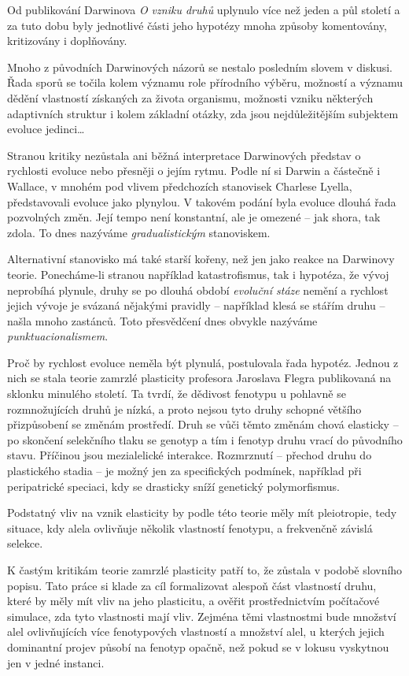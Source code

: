 Od publikování Darwinova \textit{O vzniku druhů} uplynulo více než jeden a půl století a za tuto dobu byly jednotlivé části
jeho hypotézy mnoha způsoby komentovány, kritizovány i doplňovány.

Mnoho z původních Darwinových názorů se nestalo posledním slovem v diskusi. Řada sporů se točila kolem významu role
přírodního výběru, možností a významu dědění vlastností získaných za života organismu, možnosti vzniku některých
adaptivních struktur i kolem základní otázky, zda jsou nejdůležitějším subjektem evoluce jedinci\ldots

%

Stranou kritiky nezůstala ani běžná interpretace Darwinových představ o rychlosti evoluce nebo přesněji o jejím rytmu.
Podle ní si Darwin a částečně i Wallace, v mnohém pod vlivem předchozích stanovisek Charlese Lyella,
představovali evoluce jako plynylou. V takovém podání byla evoluce dlouhá řada pozvolných změn. Její tempo není
konstantní, ale je omezené -- jak shora, tak zdola. To dnes nazýváme \textit{gradualistickým} stanoviskem.

Alternativní stanovisko má také starší kořeny, než jen jako reakce na Darwinovy teorie. Ponecháme-li stranou například
katastrofismus, tak i hypotéza, že vývoj neprobíhá plynule, druhy se po dlouhá období \textit{evoluční stáze} nemění
a rychlost jejich vývoje je svázaná nějakými pravidly -- například klesá se stářím druhu -- našla mnoho zastánců.
Toto přesvědčení dnes obvykle nazýváme \textit{punktuacionalismem}.

Proč by rychlost evoluce neměla být plynulá, postulovala řada hypotéz. Jednou z nich se stala teorie zamrzlé plasticity
profesora Jaroslava Flegra publikovaná na sklonku minulého století. Ta tvrdí, že dědivost fenotypu u pohlavně se
rozmnožujících druhů je nízká, a proto nejsou tyto druhy schopné většího přizpůsobení se změnám prostředí. Druh se vůči
těmto změnám chová elasticky -- po skončení selekčního tlaku se genotyp a tím i fenotyp druhu vrací do původního stavu.
Příčinou jsou mezialelické interakce. Rozmrznutí -- přechod druhu do plastického stadia -- je možný jen za specifických
podmínek, například při peripatrické speciaci, kdy se drasticky sníží genetický polymorfismus.

Podstatný vliv na vznik elasticity by podle této teorie měly mít pleiotropie, tedy situace, kdy alela ovlivňuje
několik vlastností fenotypu, a frekvenčně závislá selekce.

K častým kritikám teorie zamrzlé plasticity patří to, že zůstala v podobě slovního popisu. Tato práce si
klade za cíl formalizovat alespoň část vlastností druhu, které by měly mít vliv na jeho plasticitu, a ověřit
prostřednictvím počítačové simulace, zda tyto vlastnosti mají vliv. Zejména těmi vlastnostmi bude množství alel
ovlivňujících více fenotypových vlastností a množství alel, u kterých jejich dominantní projev působí na fenotyp
opačně, než pokud se v lokusu vyskytnou jen v jedné instanci.
